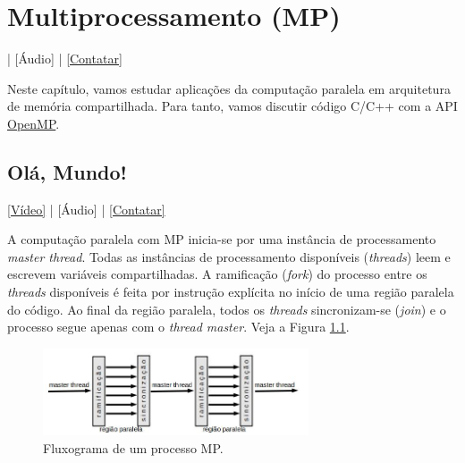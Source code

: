 
\chapter{Multiprocessamento (MP)}\label{cap_mp}
\thispagestyle{fancy}

\begin{flushright}
  [Vídeo] | [Áudio] | \href{https://phkonzen.github.io/notas/contato.html}{[Contatar]}
\end{flushright}

Neste capítulo, vamos estudar aplicações da computação paralela em arquitetura de memória compartilhada. Para tanto, vamos discutir código C/C++ com a API \href{https://www.openmp.org/}{OpenMP}.

\section{Olá, Mundo!}\label{sec_ola_cap_mp}

\begin{flushright}
  \href{https://archive.org/details/mp_ola}{[Vídeo]} | [Áudio] | \href{https://phkonzen.github.io/notas/contato.html}{[Contatar]}
\end{flushright}

A computação paralela com MP inicia-se por uma instância de processamento \emph{master thread}. Todas as instâncias de processamento disponíveis (\emph{threads}) leem e escrevem variáveis compartilhadas. A ramificação ({\it fork}) do processo entre os {\it threads} disponíveis é feita por instrução explícita no início de uma região paralela do código. Ao final da região paralela, todos os {\it threads} sincronizam-se ({\it join}) e o processo segue apenas com o {\it thread master}. Veja a Figura \ref{fig:mpwf}.

\begin{figure}[H]
  \centering
  \includegraphics[width=0.7\textwidth]{./cap_mp/dados/fig_mpwf/mpwf}
  \caption{Fluxograma de um processo MP.}
  \label{fig:mpwf}
\end{figure}


